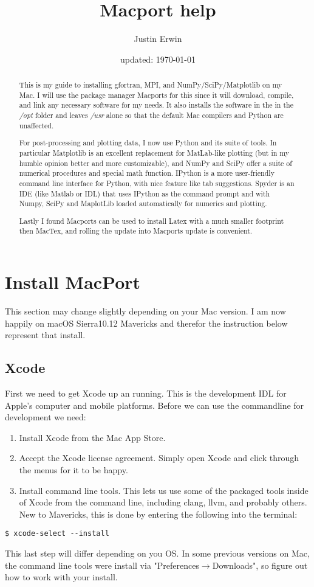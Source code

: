 \documentclass[11pt]{article}
\title{Macport help}
\author{Justin Erwin}
\date{updated: \today}
\begin{document}
\maketitle

\begin{abstract}
This is my guide to installing gfortran, MPI,  and NumPy/SciPy/Matplotlib on my Mac. I will use the package manager Macports for this since it will download, compile, and link any necessary software for my needs. It also installs the software in the in the \textit{/opt} folder and leaves \textit{/usr} alone so that the default Mac compilers and Python are unaffected.

For post-processing and plotting data, I now use Python and its suite of tools.  In particular Matplotlib is an excellent replacement for MatLab-like plotting (but in my humble opinion better and more customizable), and NumPy and SciPy offer a suite of numerical procedures and special math function. IPython is a more user-friendly command line interface for Python, with nice feature like tab suggestions. Spyder is an IDE (like Matlab or IDL) that uses IPython as the command prompt and with Numpy, SciPy and MaplotLib loaded automatically for numerics and plotting.

Lastly I found Macports can be used to install Latex with a much smaller footprint then MacTex, and rolling the update into Macports update is convenient. 
\end{abstract}


%
%
%
\tableofcontents


%
%
%
\section{Install MacPort}
This section may change slightly depending on your Mac version. I am now happily on macOS Sierra10.12 Mavericks and therefor the instruction below represent that install. 
\subsection{Xcode}
First we need to get Xcode up an running. This is the development IDL for Apple's computer and mobile platforms. Before we can use the commandline for development we need:
\begin{enumerate}
	\item Install Xcode from the Mac App Store.
	\item Accept the Xcode license agreement. Simply open Xcode and click through the menus for it to be happy.
	\item Install command line tools. This lets us use some of the packaged tools inside of Xcode from the command line, including clang, llvm, and probably others. New to Mavericks, this is done by entering the following into the terminal:
\end{enumerate}
\begin{lstlisting}[style=Bash]
$ xcode-select --install
\end{lstlisting}
This last step will differ depending on you OS. In some previous versions on Mac, the command line tools were install via "Preferences$\rightarrow$Downloads", so figure out how to work with your install.
\end{document}
